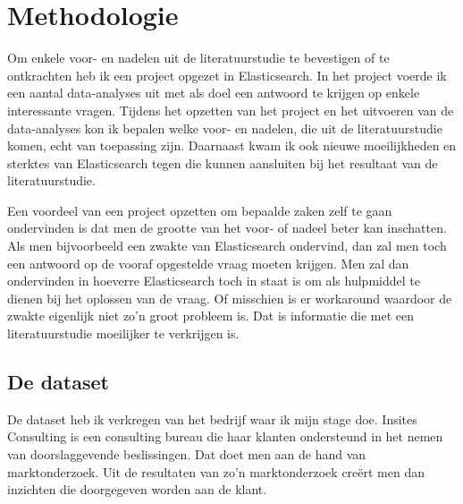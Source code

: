 
\chapter{Methodologie}
\label{ch:methodologie}


Om enkele voor- en nadelen uit de literatuurstudie te bevestigen of te ontkrachten heb ik een project opgezet in Elasticsearch. In het project voerde ik een aantal data-analyses uit met als doel een antwoord te krijgen op enkele interessante vragen. Tijdens het opzetten van het project en het uitvoeren van de data-analyses kon ik bepalen welke voor- en nadelen, die uit de literatuurstudie komen, echt van toepassing zijn. Daarnaast kwam ik ook nieuwe moeilijkheden en sterktes van Elasticsearch tegen die kunnen aansluiten bij het resultaat van de literatuurstudie.

Een voordeel van een project opzetten om bepaalde zaken zelf te gaan ondervinden is dat men de grootte van het voor- of nadeel beter kan inschatten. Als men bijvoorbeeld een zwakte van Elasticsearch ondervind, dan zal men toch een antwoord op de vooraf opgestelde vraag moeten krijgen. Men zal dan ondervinden in hoeverre Elasticsearch toch in staat is om als hulpmiddel te dienen bij het oplossen van de vraag. Of misschien is er workaround waardoor de zwakte eigenlijk niet zo'n groot probleem is. Dat is informatie die met een literatuurstudie moeilijker te verkrijgen is.

\section{De dataset}
De dataset heb ik verkregen van het bedrijf waar ik mijn stage doe. Insites Consulting is een consulting bureau die haar klanten ondersteund in het nemen van doorslaggevende beslissingen. Dat doet men aan de hand van marktonderzoek. Uit de resultaten van zo'n marktonderzoek creërt men dan inzichten die doorgegeven worden aan de klant. 

